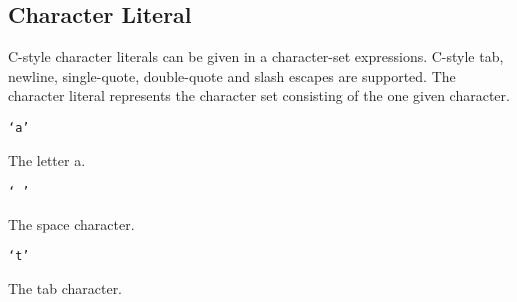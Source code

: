 
\subsection{Character Literal}
{
	C-style character literals can be given in a character-set expressions.
	C-style tab, newline, single-quote, double-quote and slash escapes are
	supported.
	The character literal represents the character set consisting of
	the one given character.
	
	\begin{itemize}
	{
		\item \texttt{`a'}
		
			The letter a.
		
		\item \texttt{` '}
		
			The space character.
		
		\item \texttt{`t'}
		
			The tab character.
	}
	\end{itemize}
}
